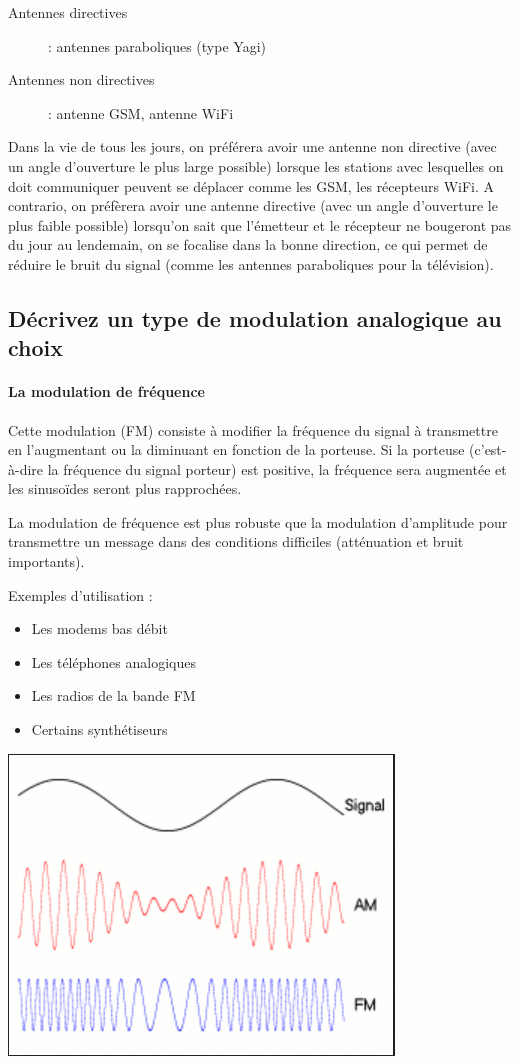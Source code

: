 \begin{description}
    \item[Antennes directives] : antennes paraboliques (type Yagi)
    \item[Antennes non directives] : antenne GSM, antenne WiFi
\end{description}

\bigskip

Dans la vie de tous les jours, on préférera avoir une antenne non directive (avec un angle d'ouverture le plus large possible) lorsque les stations avec lesquelles on doit communiquer peuvent se déplacer comme les GSM, les récepteurs WiFi. A contrario, on préfèrera avoir une antenne directive (avec un angle d'ouverture le plus faible possible) lorsqu'on sait que l'émetteur et le récepteur ne bougeront pas du jour au lendemain, on se focalise dans la bonne direction, ce qui permet de réduire le bruit du signal (comme les antennes paraboliques pour la télévision).  

\subsection{Décrivez un type de modulation analogique au choix}

\paragraph{La modulation de fréquence}

Cette modulation (FM) consiste à modifier la fréquence du signal à transmettre en l'augmentant ou la diminuant en fonction de la porteuse.  Si la porteuse (c'est-à-dire la fréquence du signal porteur) est positive, la fréquence sera augmentée et les sinusoïdes seront plus rapprochées.

La modulation de fréquence est plus robuste que la modulation d'amplitude pour transmettre un message dans des conditions difficiles (atténuation et bruit importants).

Exemples d'utilisation :
\begin{itemize}
    \item Les modems bas débit
    \item Les téléphones analogiques
    \item Les radios de la bande FM
    \item Certains synthétiseurs
\end{itemize}

\begin{center}
    \includegraphics[width=0.5\linewidth]{img/modulation_am_fm.png}
\end{center}


